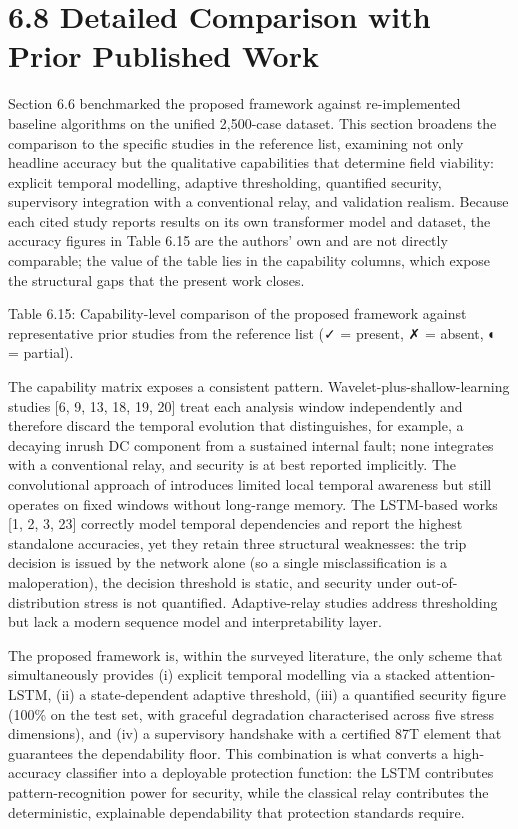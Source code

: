 \section{6.8  Detailed Comparison with Prior Published Work}
Section 6.6 benchmarked the proposed framework against re-implemented baseline algorithms on the unified 2,500-case dataset. This section broadens the comparison to the specific studies in the reference list, examining not only headline accuracy but the qualitative capabilities that determine field viability: explicit temporal modelling, adaptive thresholding, quantified security, supervisory integration with a conventional relay, and validation realism. Because each cited study reports results on its own transformer model and dataset, the accuracy figures in Table 6.15 are the authors' own and are not directly comparable; the value of the table lies in the capability columns, which expose the structural gaps that the present work closes.

Table 6.15: Capability-level comparison of the proposed framework against representative prior studies from the reference list (✓ = present, ✗ = absent, ◐ = partial).

The capability matrix exposes a consistent pattern. Wavelet-plus-shallow-learning studies [6, 9, 13, 18, 19, 20] treat each analysis window independently and therefore discard the temporal evolution that distinguishes, for example, a decaying inrush DC component from a sustained internal fault; none integrates with a conventional relay, and security is at best reported implicitly. The convolutional approach of \cite{ref16} introduces limited local temporal awareness but still operates on fixed windows without long-range memory. The LSTM-based works [1, 2, 3, 23] correctly model temporal dependencies and report the highest standalone accuracies, yet they retain three structural weaknesses: the trip decision is issued by the network alone (so a single misclassification is a maloperation), the decision threshold is static, and security under out-of-distribution stress is not quantified. Adaptive-relay studies \cite{ref21, ref32} address thresholding but lack a modern sequence model and interpretability layer.

The proposed framework is, within the surveyed literature, the only scheme that simultaneously provides (i) explicit temporal modelling via a stacked attention-LSTM, (ii) a state-dependent adaptive threshold, (iii) a quantified security figure (100\% on the test set, with graceful degradation characterised across five stress dimensions), and (iv) a supervisory handshake with a certified 87T element that guarantees the dependability floor. This combination is what converts a high-accuracy classifier into a deployable protection function: the LSTM contributes pattern-recognition power for security, while the classical relay contributes the deterministic, explainable dependability that protection standards require.


